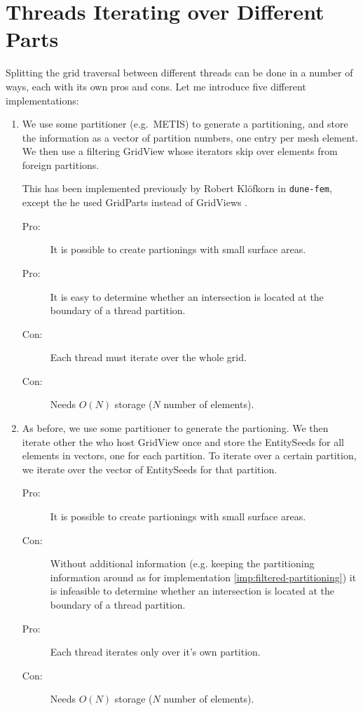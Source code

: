 \documentclass{article}
\newcommand\fem{{\tt dune-fem}\xspace}
\begin{document}
\section{Threads Iterating over Different Parts}

Splitting the grid traversal between different threads can be done in a number
of ways, each with its own pros and cons.  Let me introduce five different
implementations:
\begin{enumerate}
\item \label{imp:filtered-partitioning} We use some partitioner (e.g.\ METIS)
  to generate a partitioning, and store the information as a vector of
  partition numbers, one entry per mesh element.  We then use a filtering
  GridView whose iterators skip over elements from foreign partitions.

  This has been implemented previously by Robert Klöfkorn in \fem, except the
  he used GridParts instead of GridViews \cite{Kloefkorn2012}.
  \begin{description}
  \item[Pro:] It is possible to create partionings with small surface areas.
  \item[Pro:] It is easy to determine whether an intersection is located at
    the boundary of a thread partition.
  \item[Con:] Each thread must iterate over the whole grid.
  \item[Con:] Needs $O(N)$ storage ($N$ number of elements).
  \end{description}
\item \label{imp:entityseed-partitioning} As before, we use some partitioner
  to generate the partioning.  We then iterate other the who host GridView
  once and store the EntitySeeds for all elements in vectors, one for each
  partition.  To iterate over a certain partition, we iterate over the vector
  of EntitySeeds for that partition.
  \begin{description}
  \item[Pro:] It is possible to create partionings with small surface areas.
  \item[Con:] Without additional information (e.g. keeping the partitioning
    information around as for implementation \ref{imp:filtered-partitioning})
    it is infeasible to determine whether an intersection is located at the
    boundary of a thread partition.
  \item[Pro:] Each thread iterates only over it's own partition.
  \item[Con:] Needs $O(N)$ storage ($N$ number of elements).

\end{description}
\end{enumerate}
\end{document}
